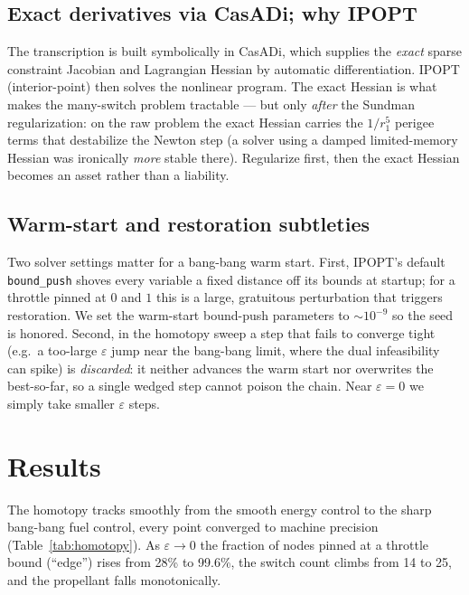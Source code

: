 \documentclass[11pt]{article}
\newcommand{\code}[1]{\texttt{#1}}
\begin{document}
\subsection{Exact derivatives via CasADi; why IPOPT}
The transcription is built symbolically in CasADi, which supplies the
\emph{exact} sparse constraint Jacobian and Lagrangian Hessian by automatic
differentiation. IPOPT (interior-point) then solves the nonlinear program. The
exact Hessian is what makes the many-switch problem tractable --- but only
\emph{after} the Sundman regularization: on the raw problem the exact Hessian
carries the $1/r_1^5$ perigee terms that destabilize the Newton step (a solver
using a damped limited-memory Hessian was ironically \emph{more} stable there).
Regularize first, then the exact Hessian becomes an asset rather than a
liability.

\subsection{Warm-start and restoration subtleties}
Two solver settings matter for a bang-bang warm start. First, IPOPT's default
\code{bound\_push} shoves every variable a fixed distance off its bounds at
startup; for a throttle pinned at $0$ and $1$ this is a large, gratuitous
perturbation that triggers restoration. We set the warm-start bound-push
parameters to $\sim\!10^{-9}$ so the seed is honored. Second, in the homotopy
sweep a step that fails to converge tight (e.g.\ a too-large $\varepsilon$ jump
near the bang-bang limit, where the dual infeasibility can spike) is
\emph{discarded}: it neither advances the warm start nor overwrites the
best-so-far, so a single wedged step cannot poison the chain. Near
$\varepsilon=0$ we simply take smaller $\varepsilon$ steps.

\section{Results}
\label{sec:results}
The homotopy tracks smoothly from the smooth energy control to the sharp
bang-bang fuel control, every point converged to machine precision
(Table~\ref{tab:homotopy}). As $\varepsilon\to0$ the fraction of nodes pinned
at a throttle bound (``edge'') rises from 28\% to 99.6\%, the switch count
climbs from 14 to 25, and the propellant falls monotonically.
\end{document}
